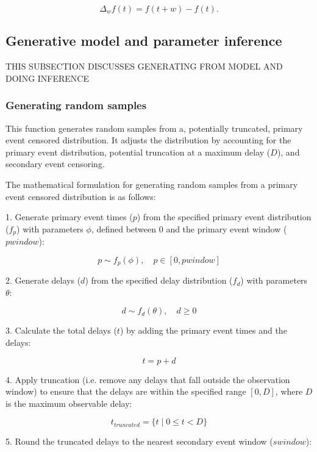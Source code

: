 \documentclass[10pt,letterpaper]{article}
\begin{document}
\begin{equation}
\Delta_{w}f(t) = f(t + w) - f(t).
\end{equation}

\subsection{Generative model and parameter inference}
THIS SUBSECTION DISCUSSES GENERATING FROM MODEL AND DOING INFERENCE 
\subsubsection{Generating random samples}
This function generates random samples from a, potentially truncated, primary event censored distribution. It adjusts the distribution by accounting for the primary event distribution, potential truncation at a maximum delay ($D$), and secondary event censoring.

The mathematical formulation for generating random samples from a primary event censored distribution is as follows:

1. Generate primary event times ($p$) from the specified primary event distribution ($f_p$) with parameters $\phi$, defined between 0 and the primary event window ($pwindow$):

\begin{equation}p \sim f_p(\phi), \quad p \in [0, pwindow]\end{equation}

2. Generate delays ($d$) from the specified delay distribution ($f_d$) with parameters $\theta$:

\begin{equation}d \sim f_d(\theta), \quad d \geq 0\end{equation}

3. Calculate the total delays ($t$) by adding the primary event times and the delays:

\begin{equation}t = p + d\end{equation}

4. Apply truncation (i.e. remove any delays that fall outside the observation window) to ensure that the delays are within the specified range $[0, D]$, where $D$ is the maximum observable delay:

\begin{equation}
t_{truncated} = \{t \mid 0 \leq t < D\}
\end{equation}

5. Round the truncated delays to the nearest secondary event window ($swindow$):
\end{document}

